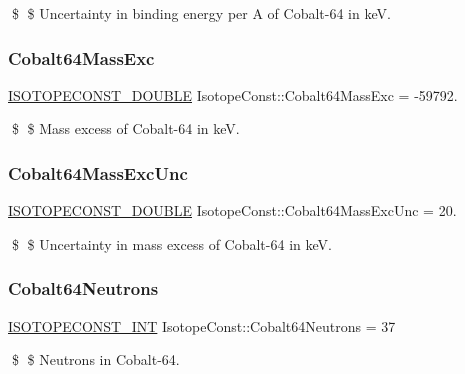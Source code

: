 \$ \$ Uncertainty in binding energy per A of Cobalt-\/64 in keV. \mbox{\label{group___isotope_const-_cobalt-_co64_ga2bdd4c9f1ecab295ecf31225dacfad01}} 
\subsubsection{\texorpdfstring{Cobalt64\+Mass\+Exc}{Cobalt64MassExc}}
{\footnotesize\ttfamily \mbox{\hyperlink{group___isotope_const-_macros_ga8f45a7272ce02c0b4c65c44636ed719a}{I\+S\+O\+T\+O\+P\+E\+C\+O\+N\+S\+T\+\_\+\+D\+O\+U\+B\+LE}} Isotope\+Const\+::\+Cobalt64\+Mass\+Exc = -\/59792.}

\$ \$ Mass excess of Cobalt-\/64 in keV. \mbox{\label{group___isotope_const-_cobalt-_co64_ga50690184e6bdd87dd258da8058753797}} 
\subsubsection{\texorpdfstring{Cobalt64\+Mass\+Exc\+Unc}{Cobalt64MassExcUnc}}
{\footnotesize\ttfamily \mbox{\hyperlink{group___isotope_const-_macros_ga8f45a7272ce02c0b4c65c44636ed719a}{I\+S\+O\+T\+O\+P\+E\+C\+O\+N\+S\+T\+\_\+\+D\+O\+U\+B\+LE}} Isotope\+Const\+::\+Cobalt64\+Mass\+Exc\+Unc = 20.}

\$ \$ Uncertainty in mass excess of Cobalt-\/64 in keV. \mbox{\label{group___isotope_const-_cobalt-_co64_ga03e83986b226ff956c638df864026259}} 
\subsubsection{\texorpdfstring{Cobalt64\+Neutrons}{Cobalt64Neutrons}}
{\footnotesize\ttfamily \mbox{\hyperlink{group___isotope_const-_macros_ga5f18360b3e99483a35c32d789e62621c}{I\+S\+O\+T\+O\+P\+E\+C\+O\+N\+S\+T\+\_\+\+I\+NT}} Isotope\+Const\+::\+Cobalt64\+Neutrons = 37}

\$ \$ Neutrons in Cobalt-\/64. \mbox{\label{group___isotope_const-_cobalt-_co64_ga6662f1f77df5f78d0708cb3d61701ce0}} 

